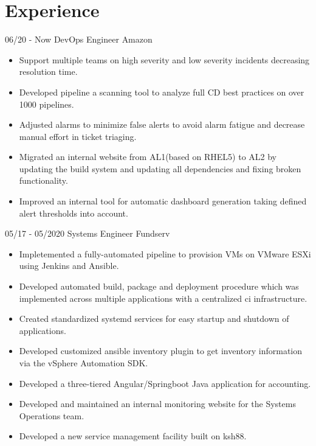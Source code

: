 \documentclass[]{friggeri-cv}
\begin{document}
\section{Experience}
\begin{entrylist}
  \entry
    {06/20 - Now}
    {DevOps Engineer}
    {Amazon}
    {\begin{itemize}
        \item Support multiple teams on high severity and low severity incidents decreasing resolution time.
        \item Developed pipeline a scanning tool to analyze full CD best practices on over 1000 pipelines.
        \item Adjusted alarms to minimize false alerts to avoid alarm fatigue and decrease manual effort in ticket triaging.
        \item Migrated an internal website from AL1(based on RHEL5) to AL2 by updating the build system and updating all dependencies and fixing broken functionality.
        \item Improved an internal tool for automatic dashboard generation taking defined alert thresholds into account.
    \end{itemize}}
  \entry
    {05/17 - 05/2020}
    {Systems Engineer}
    {Fundserv}
    {\begin{itemize}
        \item Impletemented a fully-automated pipeline to provision VMs on VMware ESXi using Jenkins and Ansible.
        \item Developed automated build, package and deployment procedure which was implemented across multiple applications with a centralized ci infrastructure.
        \item Created standardized systemd services for easy startup and shutdown of applications.
        \item Developed customized ansible inventory plugin to get inventory information via the vSphere Automation SDK.
        \item Developed a three-tiered Angular/Springboot Java application for accounting.
        \item Developed and maintained an internal monitoring website for the Systems Operations team.
        \item Developed a new service management facility built on ksh88.
    \end{itemize}}
\end{entrylist}
\end{document}
